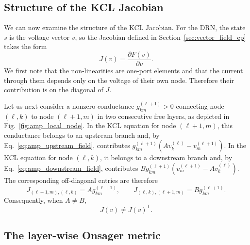 \documentclass{article}
\begin{document}
\subsection{Structure of the KCL Jacobian}

We can now examine the structure of the KCL Jacobian. For the DRN, the
state $s$ is the voltage vector $v$, so the Jacobian defined in
Section~\ref{sec:vector_field_ep} takes the form
\begin{equation}
J(v)=\frac{\partial F(v)}{\partial v}.
\label{eq:amp_field_jacobian}
\end{equation}
We first note that the non-linearities are one-port elements and that the
current through them depends only on the voltage of their own node. Therefore
their contribution is on the
diagonal of \(J\). 

Let us next consider a nonzero conductance \(g_{km}^{(\ell+1)}>0\) connecting
node \((\ell,k)\) to node \((\ell+1,m)\) in two consecutive free layers, as
depicted in Fig.~\ref{fig:amp_local_node}. In
the KCL equation for node \((\ell+1,m)\), this conductance belongs to an
upstream branch and, by Eq.~\eqref{eq:amp_upstream_field}, contributes
\(g_{km}^{(\ell+1)}(A v_k^{(\ell)}-v_m^{(\ell+1)})\). In the KCL equation for
node \((\ell,k)\), it belongs to a downstream branch and, by
Eq.~\eqref{eq:amp_downstream_field}, contributes
\(B g_{km}^{(\ell+1)}(v_m^{(\ell+1)}-A v_k^{(\ell)})\).
The corresponding off-diagonal entries are therefore
\begin{equation}
J_{(\ell+1,m),(\ell,k)}
=
A g_{km}^{(\ell+1)},
\qquad
J_{(\ell,k),(\ell+1,m)}
=
B g_{km}^{(\ell+1)}.
\label{eq:amp_asymmetric_edge_entries}
\end{equation}
Consequently, when \(A\neq B\),
\begin{equation}
J(v)\neq J(v)^{\mathsf T}.
\label{eq:amp_raw_jacobian_asymmetric}
\end{equation}

\subsection{The layer-wise Onsager metric}
\end{document}
